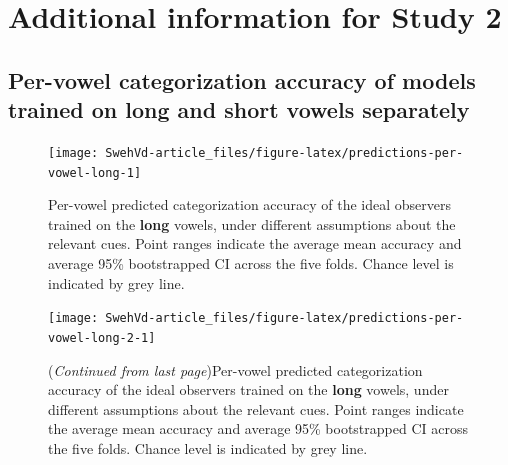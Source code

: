 \documentclass[utf8]{frontiersSCNS}
\begin{document}
\newpage

\hypertarget{additional-information-for-study-2}{%
\section{Additional information for Study 2}\label{additional-information-for-study-2}}

\hypertarget{sec:accuracy-per-vowel}{%
\subsection*{Per-vowel categorization accuracy of models trained on long and short vowels separately}\label{sec:accuracy-per-vowel}}



\begin{landscape}

\begin{figure}

{\centering \texttt{[image: SwehVd-article\_files/figure-latex/predictions-per-vowel-long-1]} 

}

\caption{Per-vowel predicted categorization accuracy of the ideal observers trained on the \textbf{long} vowels, under different assumptions about the relevant cues. Point ranges indicate the average mean accuracy and average 95\% bootstrapped CI across the five folds. Chance level is indicated by grey line.}\label{fig:predictions-per-vowel-long}
\end{figure}
\end{landscape}



\begin{landscape}

\begin{figure}

{\centering \texttt{[image: SwehVd-article\_files/figure-latex/predictions-per-vowel-long-2-1]} 

}

\caption{(\emph{Continued from last page})Per-vowel predicted categorization accuracy of the ideal observers trained on the \textbf{long} vowels, under different assumptions about the relevant cues. Point ranges indicate the average mean accuracy and average 95\% bootstrapped CI across the five folds. Chance level is indicated by grey line.}\label{fig:predictions-per-vowel-long-2}
\end{figure}
\end{landscape}
\end{document}
